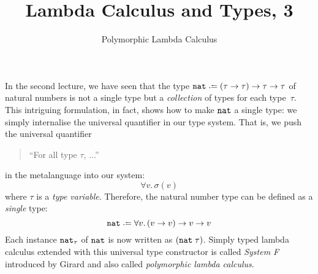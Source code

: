 \title{Lambda Calculus and Types, 3}
\subtitle{Polymorphic Lambda Calculus}

\begin{frame}
\maketitle
\end{frame}

In the second lecture, we have seen that the type $\nat \defeq (\tau \to \tau)
\to \tau \to \tau$ of natural numbers is not a single type but a
\emph{collection} of types for each type~$\tau$. This intriguing formulation, in
fact, shows how to make $\mathtt{nat}$ a single type: we simply internalise the
universal quantifier in our type system. That is, we push the universal
quantifier 
\begin{quote}
``For all type $\tau$, ...''
\end{quote}
in the metalanguage into our system:
\[
  \forall v.\, \sigma(v)
\]
where $\tau$ is a \emph{type variable}. Therefore, the natural number type can
be defined as a \emph{single} type:
\[
  \nat \defeq \forall v.\, (v \to v) \to v \to v
\]
Each instance $\mathtt{nat}_\tau$ of $\mathtt{nat}$ is now written as $(\mathtt{nat}\;\tau)$.  Simply
typed lambda calculus extended with this universal type constructor is called
\emph{System F} introduced by Girard and also called \emph{polymorphic lambda
  calculus}.

